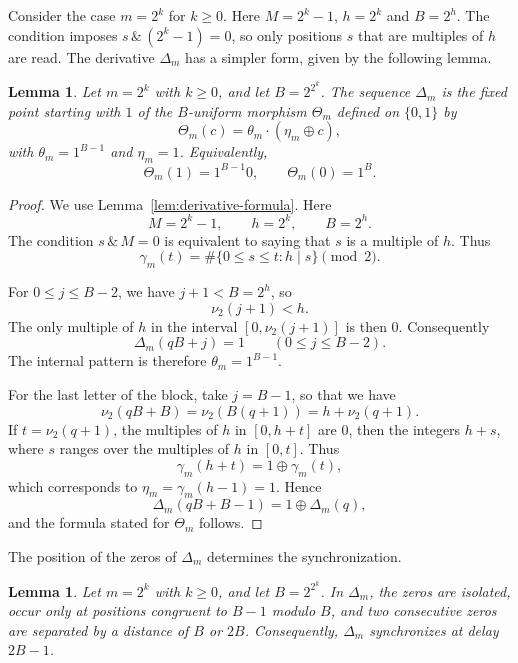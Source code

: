 \documentclass[12pt,reqno]{article}
\theoremstyle{plain}
\newtheorem{lemma}[theorem]{Lemma}
\theoremstyle{definition}
\begin{document}
Consider the case $m = 2^k$ for $k \ge 0$. Here $M = 2^k-1$, $h = 2^k$ and $B = 2^h$. The condition imposes $s\,\&\,(2^k-1) = 0$, so only positions $s$ that are multiples of $h$ are read. The derivative $\Delta_m$ has a simpler form, given by the following lemma.

\begin{lemma}
\label{lem:derived-morphism-primary}
Let $m = 2^k$ with $k \ge 0$, and let $B = 2^{2^k}$. The sequence $\Delta_m$ is the fixed point starting with $1$ of the $B$-uniform morphism $\Theta_m$ defined on $\{0,1\}$ by
\[
  \Theta_m(c) = \theta_m \cdot (\eta_m \oplus c),
\]
with $\theta_m = 1^{B-1}$ and $\eta_m = 1$. Equivalently,
\[
  \Theta_m(1) = 1^{B-1} 0, \qquad \Theta_m(0) = 1^B.
\]
\end{lemma}

\begin{proof}
We use Lemma~\ref{lem:derivative-formula}. Here
\[
  M = 2^k - 1, \qquad h = 2^k, \qquad B = 2^h.
\]
The condition $s \,\&\, M = 0$ is equivalent to saying that $s$ is a multiple of $h$. Thus
\[
  \gamma_m(t) = \#\{0 \le s \le t : h \mid s\} \pmod 2.
\]

For $0 \le j \le B - 2$, we have $j + 1 < B = 2^h$, so
\[
  \nu_2(j + 1) < h.
\]
The only multiple of $h$ in the interval $[0, \nu_2(j+1)]$ is then $0$. Consequently
\[
  \Delta_m(qB + j) = 1 \qquad (0 \le j \le B - 2).
\]
The internal pattern is therefore $\theta_m = 1^{B-1}$.

For the last letter of the block, take $j = B - 1$, so that we have
\[
  \nu_2(qB + B) = \nu_2(B(q + 1)) = h + \nu_2(q + 1).
\]
If $t = \nu_2(q + 1)$, the multiples of $h$ in $[0, h + t]$ are $0$, then the integers $h + s$, where $s$ ranges over the multiples of $h$ in $[0, t]$. Thus
\[
  \gamma_m(h + t) = 1 \oplus \gamma_m(t),
\]
which corresponds to $\eta_m = \gamma_m(h-1) = 1$. Hence
\[
  \Delta_m(qB + B - 1) = 1 \oplus \Delta_m(q),
\]
and the formula stated for $\Theta_m$ follows.
\end{proof}

The position of the zeros of $\Delta_m$ determines the synchronization.

\begin{lemma}
\label{lem:zero-geometry}
Let $m = 2^k$ with $k \ge 0$, and let $B = 2^{2^k}$. In $\Delta_m$, the zeros are isolated, occur only at positions congruent to $B - 1$ modulo $B$, and two consecutive zeros are separated by a distance of $B$ or $2B$. Consequently, $\Delta_m$ synchronizes at delay $2B - 1$.
\end{lemma}
\end{document}
